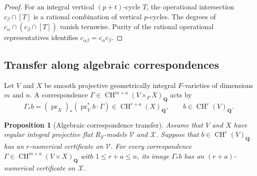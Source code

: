 \documentclass[11pt]{article}
\newtheorem{proposition}[theorem]{Proposition}
\theoremstyle{definition}
\theoremstyle{remark}
\numberwithin{equation}{section}
\newcommand{\CH}{\operatorname{CH}}
\begin{document}
\begin{proof}
For an integral vertical $(p+t)$-cycle $T$, the operational
intersection $c_\beta\cap[T]$ is a rational combination of
vertical $p$-cycles.  The degrees of
$c_\alpha\cap(c_\beta\cap[T])$ vanish termwise.  Purity of
the rational operational representatives identifies
$c_{\alpha\beta}=c_\alpha c_\beta$.
\end{proof}

\subsection{Transfer along algebraic correspondences}

Let $V$ and $X$ be smooth projective geometrically integral
$F$-varieties of dimensions $m$ and $n$.  A correspondence
$\Gamma\in\CH^{m+a}(V\times_F X)_{\mathbf Q}$ acts by
\[
 \Gamma_*b=(\operatorname{pr}_X)_*
             (\operatorname{pr}_V^*b\cdot\Gamma)
       \in\CH^{r+a}(X)_{\mathbf Q},
       \qquad b\in\CH^r(V)_{\mathbf Q}.
\]

\begin{proposition}[Algebraic correspondence transfer]
\label{prop:correspondence-transfer}
Assume that $V$ and $X$ have regular integral projective flat
$R_F$-models $\mathcal V$ and $\mathcal X$.  Suppose that
$b\in\CH^r(V)_{\mathbf Q}$ has an $r$-numerical certificate
on $\mathcal V$.  For every correspondence
$\Gamma\in\CH^{m+a}(V\times X)_{\mathbf Q}$ with
$1\le r+a\le n$, its image $\Gamma_*b$ has an
$(r+a)$-numerical certificate on $\mathcal X$.
\end{proposition}
\end{document}
